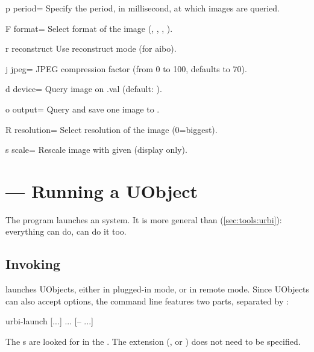 \begin{options}[Tuning]
\item[p]{period=} Specify the period, in millisecond, at
  which images are queried.
\item[F]{format=} Select format of the image (,
  , , ).
\item[r]{reconstruct} Use reconstruct mode (for aibo).
\item[j]{jpeg=} JPEG compression factor (from 0 to 100,
  defaults to 70).
\item[d]{device=} Query image on .val
  (default: ).
\item[o]{output=} Query and save one image to .
\item[R]{resolution=} Select resolution of the image
  (0=biggest).
\item[s]{scale=} Rescale image with given 
  (display only).
\end{options}


\section{ --- Running a UObject}
\label{sec:tools:urbi-launch}

The  program launches an \urbi system.  It is
more general than  (\autoref{sec:tools:urbi}):
everything  can do,  can do it too.

\subsection{Invoking }

 launches UObjects, either in plugged-in mode, or
in remote mode.  Since UObjects can also accept options, the command
line features two parts, separated by \samp{--}:

\begin{shell}
urbi-launch [...] ... [-- ...]
\end{shell}

The s are looked for in the .  The
 extension (, or ) does not need to be
specified.

